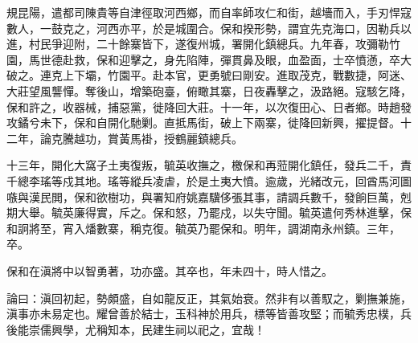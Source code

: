 \begin{pinyinscope}
規昆陽，遣都司陳貴等自津徑取河西鄉，而自率師攻仁和街，越墻而入，手刃悍寇數人，一鼓克之，河西亦平，於是城圍合。保和揆形勢，謂宜先克海口，因勒兵以進，村民爭迎附，二十餘寨皆下，遂復州城，署開化鎮總兵。九年春，攻彌勒竹園，馬世德赴救，保和迎擊之，身先陷陣，彈貫鼻及眼，血盈面，士卒憤懣，卒大破之。連克上下壩，竹園平。赴本官，更勇號曰剛安。進取茂克，戰數捷，阿迷、大莊望風讋憚。奪後山，增築砲臺，俯瞰其寨，日夜轟擊之，汲路絕。寇駭乞降，保和許之，收器械，捕惡黨，徙降回大莊。十一年，以次復田心、日者鄉。時趙發攻鐍兮未下，保和自開化馳剿。直抵馬街，破上下兩寨，徙降回新興，擢提督。十二年，論克騰越功，賞黃馬褂，授鶴麗鎮總兵。

十三年，開化大窩子土夷復叛，毓英收撫之，檄保和再蒞開化鎮任，發兵二千，責千總李瑤等戍其地。瑤等縱兵凌虐，於是土夷大憤。逾歲，光緒改元，回酋馬河圖嗾與漢民閧，保和欲樹功，與署知府姚嘉驥侈張其事，請調兵數千，發餉巨萬，剋期大舉。毓英廉得實，斥之。保和怒，乃罷戍，以失守聞。毓英遣何秀林進擊，保和詗將至，宵入燔數寨，稱克復。毓英乃罷保和。明年，調湖南永州鎮。三年，卒。

保和在滇將中以智勇著，功亦盛。其卒也，年未四十，時人惜之。

論曰：滇回初起，勢頗盛，自如龍反正，其氣始衰。然非有以善馭之，剿撫兼施，滇事亦未易定也。耀曾善於結士，玉科神於用兵，標等皆善攻堅；而毓秀忠樸，兵後能崇儒興學，尤稱知本，民建生祠以祀之，宜哉！


\end{pinyinscope}